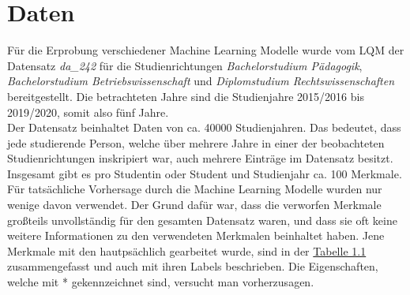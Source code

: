 

\section{Daten}
\label{sec:daten}

F\"ur die Erprobung verschiedener Machine Learning Modelle wurde vom LQM der Datensatz
\textit{da\_242} f\"ur die Studienrichtungen \textit{Bachelorstudium P\"adagogik},
\textit{Bachelorstudium Betriebswissenschaft} und \textit{Diplomstudium Rechtswissenschaften} bereitgestellt.
Die betrachteten Jahre sind die Studienjahre 2015/2016 bis 2019/2020, somit also f\"unf Jahre. \\

Der Datensatz beinhaltet Daten von ca. 40000 Studienjahren. Das bedeutet, dass jede studierende Person,
welche \"uber mehrere Jahre in einer der beobachteten Studienrichtungen inskripiert war, auch mehrere Eintr\"age im Datensatz besitzt. \\

Insgesamt gibt es pro Studentin oder Student und Studienjahr ca. 100 Merkmale.
F\"ur tats\"achliche Vorhersage durch die Machine Learning Modelle wurden nur wenige davon verwendet.
Der Grund daf\"ur war, dass die verworfen Merkmale gro{\ss}teils unvollst\"andig f\"ur den gesamten Datensatz waren,
und dass sie oft keine weitere Informationen zu den verwendeten Merkmalen beinhaltet haben. Jene Merkmale mit den hautps\"achlich
gearbeitet wurde, sind in der \hyperref[tab:name]{Tabelle 1.1} zusammengefasst und auch mit ihren Labels beschrieben. Die Eigenschaften, welche mit
*  gekennzeichnet sind, versucht man vorherzusagen.


